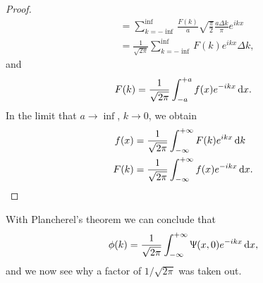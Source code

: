 \begin{proof}
\begin{subequations}
\begin{align}
&=\sum_{k=-\inf}^{\inf}\frac{F(k)}{a}\sqrt{\frac{\pi}{2}}\frac{a\Delta k}{\pi}e^{ikx}\\
&=\frac{1}{\sqrt{2\pi}}\sum_{k=-\inf}^{\inf}F(k)e^{ikx}\Delta k,
\end{align}
\end{subequations}
and 
\begin{equation}
F(k)=\frac{1}{\sqrt{2\pi}}\int^{+a}_{-a}f(x)e^{-ikx}\dx.
\end{equation}
In the limit that $a\rightarrow\inf$, $k\rightarrow0$, we obtain
\begin{subequations}
\begin{align}
f(x)&=\frac{1}{\sqrt{2\pi}}\intinf F(k)e^{ikx}\dif k\\
F(k)&=\frac{1}{\sqrt{2\pi}}\intinf f(x)e^{-ikx}\dx.
\end{align}
\end{subequations}
\end{proof}
With Plancherel's theorem we can conclude that 
\begin{equation}
\phi(k)=\frac{1}{\sqrt{2\pi}}\intinf\ups(x,0)e^{-ikx}\dx,
\end{equation}
and we now see why a factor of $1/\sqrt{2\pi}$ was taken out. \\
